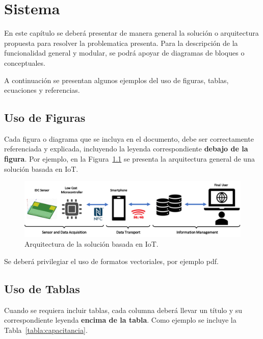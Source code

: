 \chapter{Sistema}\label{solucion}

\begin{tcolorbox}[width=\textwidth,colback={white},title={\textbf{Lineamientos del Capítulo Sistema}},colbacktitle=black,coltitle=white]    
En este capítulo se deberá presentar de manera general la solución o arquitectura propuesta para resolver la problematica presenta. Para la descripción de la funcionalidad general y modular, se podrá apoyar de diagramas de bloques o conceptuales.
\end{tcolorbox}    


A continuación se presentan algunos ejemplos del uso de figuras, tablas, ecuaciones y referencias.


\section{Uso de Figuras}

Cada figura o diagrama que se incluya en el documento, debe ser correctamente referenciada y explicada, incluyendo la leyenda correspondiente \textbf{debajo de la figura}. Por ejemplo, en la Figura~\ref{fig:arch} se presenta la arquitectura general de una solución basada en IoT.

\begin{figure}[ht]
\centering
\includegraphics[width=15cm]{Cap3/arch.pdf}
\caption{Arquitectura de la solución basada en IoT.} \label{fig:arch}
\end{figure}

Se deberá privilegiar el uso de formatos vectoriales, por ejemplo pdf.


\section{Uso  de Tablas}

Cuando se requiera incluir tablas, cada columna deberá llevar un título y su correspondiente leyenda \textbf{encima de la tabla}. Como ejemplo se incluye la Tabla~\ref{tabla:capacitancia}.

